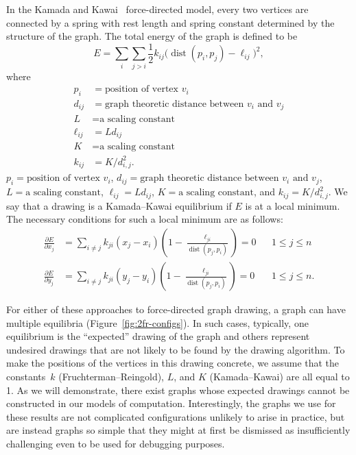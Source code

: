 \documentclass[oribibl,10pt]{llncs}
\DeclareMathOperator{\dist}{dist}
\begin{document}
In the Kamada and Kawai~\cite{KamKaw-IPL-1989} 
force-directed model, every two vertices are connected by a spring with rest length and spring constant determined by the structure of the graph. The total energy of the graph is defined to be
\[
    E = \sum_i \sum_{j > i} \frac{1}{2} k_{ij} \big(\dist(p_i,p_j) - \ell_{ij} \big)^2,
\]
where
\ifFull
\begin{align*}
p_i &= \text{position of vertex $v_i$}\\
d_{ij} &= \text{graph theoretic distance between $v_i$ and $v_j$}\\
L &= \text{a scaling constant}\\
\ell_{ij} &= Ld_{ij}\\
K &= \text{a scaling constant}\\
k_{ij} &= K/d_{i,j}^2.
\end{align*}
\else
$p_i = \text{position of vertex $v_i$}$,
$d_{ij} = \text{graph theoretic distance between $v_i$ and $v_j$}$,
$L = \text{a scaling constant}$,
$\ell_{ij} = Ld_{ij}$,
$K = \text{a scaling constant}$,
and
$k_{ij} = K/d_{i,j}^2$.
\fi
We say that a drawing is a Kamada--Kawai equilibrium if $E$ is at a local minimum. The necessary conditions for such a local minimum are as follows:
\begin{align*}
\frac{\partial E}{\partial x_j} &= \sum_{i \neq j} k_{ji}
(x_j - x_i) \left(1 - \frac{\ell_{ji}}{\dist(p_j, p_i)}\right)=0 && 1 \leq j \leq n\\
\frac{\partial E}{\partial y_j} &= \sum_{i \neq j} k_{ji}
(y_j - y_i) \left(1 - \frac{\ell_{ji}}{\dist(p_j, p_i)}\right)=0 && 1 \leq j \leq n.
\end{align*}

For either of these approaches to
force-directed graph drawing, a graph can have multiple equilibria (Figure~\ref{fig:2fr-configs}).
In such cases, typically, one equilibrium is the ``expected'' drawing of the graph and others represent undesired drawings that are not likely to be found by the drawing algorithm. To make the positions of the vertices in this drawing concrete, we assume that the constants~$k$ (Fruchterman--Reingold), $L$, and $K$ (Kamada--Kawai) are all equal to 1.
As we will demonstrate, there exist graphs whose expected drawings cannot be constructed in our models of computation.
Interestingly, the graphs we use for these results
are not complicated configurations unlikely to 
arise in practice, but are instead graphs so simple 
that they might at first
be dismissed as insufficiently challenging even 
to be used for debugging purposes.
\end{document}
